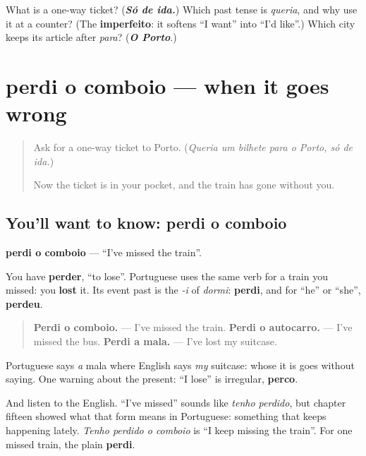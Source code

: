 \begin{tcolorbox}[breakable,colback=teal!4,colframe=teal!35!black,title={Before you move on}]
What is a one-way ticket? (\emph{\textbf{Só de ida.}}) Which past tense is \emph{queria}, and why use it at a counter? (The \textbf{imperfeito}: it softens \textquotedblleft{}I want\textquotedblright{} into \textquotedblleft{}I'd like\textquotedblright{}.) Which city keeps its article after \emph{para}? (\emph{\textbf{O Porto}}.)
\end{tcolorbox}
\section[perdi o comboio]{perdi o comboio — when it goes wrong}

\label{lesson:PT-C264-perdi-o-comboio}



\begin{quote}
Ask for a one-way ticket to Porto. (\emph{Queria um bilhete para o Porto, só de ida.})

Now the ticket is in your pocket, and the train has gone without you.
\end{quote}

\subsection*{You'll want to know: perdi o comboio}
\textbf{perdi o comboio} — \textquotedblleft{}I've missed the train\textquotedblright{}.

You have \textbf{perder}, \textquotedblleft{}to lose\textquotedblright{}. Portuguese uses the same verb for a train you missed: you \textbf{lost} it. Its event past is the \emph{-i} of \emph{dormi}: \textbf{perdi}, and for \textquotedblleft{}he\textquotedblright{} or \textquotedblleft{}she\textquotedblright{}, \textbf{perdeu}.

\begin{quote}
\textbf{Perdi o comboio.} — I've missed the train. \textbf{Perdi o autocarro.} — I've missed the bus. \textbf{Perdi a mala.} — I've lost my suitcase.
\end{quote}

Portuguese says \emph{a} mala where English says \emph{my} suitcase: whose it is goes without saying. One warning about the present: \textquotedblleft{}I lose\textquotedblright{} is irregular, \textbf{perco}.

And listen to the English. \textquotedblleft{}I've missed\textquotedblright{} sounds like \emph{tenho perdido}, but chapter fifteen showed what that form means in Portuguese: something that keeps happening lately. \emph{Tenho perdido o comboio} is \textquotedblleft{}I keep missing the train\textquotedblright{}. For one missed train, the plain \textbf{perdi}.

